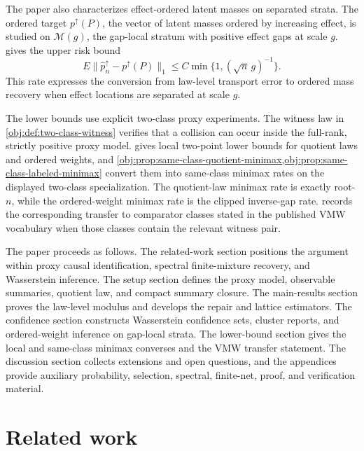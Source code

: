 \documentclass[11pt]{article}
\begin{document}
The paper also characterizes effect-ordered latent masses on separated strata.  The ordered target \(p^\uparrow(P)\), the vector of latent masses ordered by increasing effect, is studied on \(\mathcal M(g)\), the gap-local stratum with positive effect gaps at scale \(g\).   gives the upper risk bound
\[
E\|\widehat p_n^\uparrow-p^\uparrow(P)\|_1
\le
C\min\{1,(\sqrt n\,g)^{-1}\}.
\]
This rate expresses the conversion from law-level transport error to ordered mass recovery when effect locations are separated at scale \(g\).

The lower bounds use explicit two-class proxy experiments.  The witness law in \cref{obj:def:two-class-witness} verifies that a collision can occur inside the full-rank, strictly positive proxy model.   gives local two-point lower bounds for quotient laws and ordered weights, and \cref{obj:prop:same-class-quotient-minimax,obj:prop:same-class-labeled-minimax} convert them into same-class minimax rates on the displayed two-class specialization.  The quotient-law minimax rate is exactly root-\(n\), while the ordered-weight minimax rate is the clipped inverse-gap rate.   records the corresponding transfer to comparator classes stated in the published VMW vocabulary when those classes contain the relevant witness pair.

The paper proceeds as follows.  The related-work section positions the argument within proxy causal identification, spectral finite-mixture recovery, and Wasserstein inference.  The setup section defines the proxy model, observable summaries, quotient law, and compact summary closure.  The main-results section proves the law-level modulus and develops the repair and lattice estimators.  The confidence section constructs Wasserstein confidence sets, cluster reports, and ordered-weight inference on gap-local strata.  The lower-bound section gives the local and same-class minimax converses and the VMW transfer statement.  The discussion section collects extensions and open questions, and the appendices provide auxiliary probability, selection, spectral, finite-net, proof, and verification material.


\section{Related work}
\end{document}
